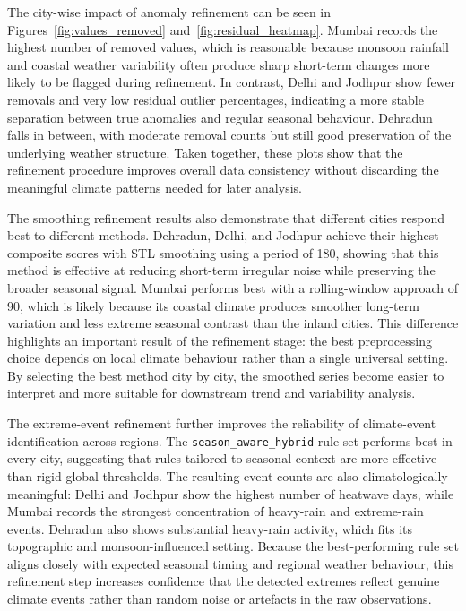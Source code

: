 The city-wise impact of anomaly refinement can be seen in
Figures~\ref{fig:values_removed} and~\ref{fig:residual_heatmap}.
Mumbai records the highest number of removed values, which is reasonable because
monsoon rainfall and coastal weather variability often produce sharp short-term
changes more likely to be flagged during refinement.
In contrast, Delhi and Jodhpur show fewer removals and very low residual outlier
percentages, indicating a more stable separation between true anomalies and regular
seasonal behaviour.
Dehradun falls in between, with moderate removal counts but still good preservation
of the underlying weather structure.
Taken together, these plots show that the refinement procedure improves overall
data consistency without discarding the meaningful climate patterns needed for
later analysis.

The smoothing refinement results also demonstrate that different cities respond
best to different methods.
Dehradun, Delhi, and Jodhpur achieve their highest composite scores with STL
smoothing using a period of 180, showing that this method is effective at reducing
short-term irregular noise while preserving the broader seasonal signal.
Mumbai performs best with a rolling-window approach of 90, which is likely because
its coastal climate produces smoother long-term variation and less extreme seasonal
contrast than the inland cities.
This difference highlights an important result of the refinement stage: the best
preprocessing choice depends on local climate behaviour rather than a single
universal setting.
By selecting the best method city by city, the smoothed series become easier to
interpret and more suitable for downstream trend and variability analysis.

The extreme-event refinement further improves the reliability of climate-event
identification across regions.
The \texttt{season\_aware\_hybrid} rule set performs best in every city, suggesting
that rules tailored to seasonal context are more effective than rigid global thresholds.
The resulting event counts are also climatologically meaningful: Delhi and Jodhpur
show the highest number of heatwave days, while Mumbai records the strongest
concentration of heavy-rain and extreme-rain events.
Dehradun also shows substantial heavy-rain activity, which fits its topographic
and monsoon-influenced setting.
Because the best-performing rule set aligns closely with expected seasonal timing
and regional weather behaviour, this refinement step increases confidence that the
detected extremes reflect genuine climate events rather than random noise or
artefacts in the raw observations.

